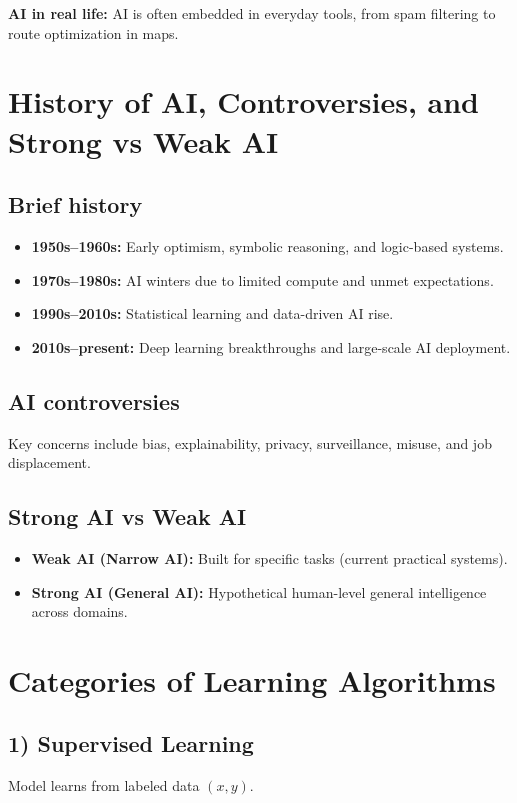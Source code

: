 \documentclass[12pt,a4paper]{article}
\begin{document}
\textbf{AI in real life:} AI is often embedded in everyday tools, from spam filtering to route optimization in maps.

\section{\textcolor{primary}{History of AI, Controversies, and Strong vs Weak AI}}

\subsection*{Brief history}
\begin{itemize}[noitemsep]
    \item \textbf{1950s--1960s:} Early optimism, symbolic reasoning, and logic-based systems.
    \item \textbf{1970s--1980s:} AI winters due to limited compute and unmet expectations.
    \item \textbf{1990s--2010s:} Statistical learning and data-driven AI rise.
    \item \textbf{2010s--present:} Deep learning breakthroughs and large-scale AI deployment.
\end{itemize}

\subsection*{AI controversies}
Key concerns include bias, explainability, privacy, surveillance, misuse, and job displacement.

\subsection*{Strong AI vs Weak AI}
\begin{itemize}[noitemsep]
    \item \textbf{Weak AI (Narrow AI):} Built for specific tasks (current practical systems).
    \item \textbf{Strong AI (General AI):} Hypothetical human-level general intelligence across domains.
\end{itemize}

\section{\textcolor{primary}{Categories of Learning Algorithms}}

\subsection*{1) Supervised Learning}
Model learns from labeled data $(x, y)$.
\end{document}
